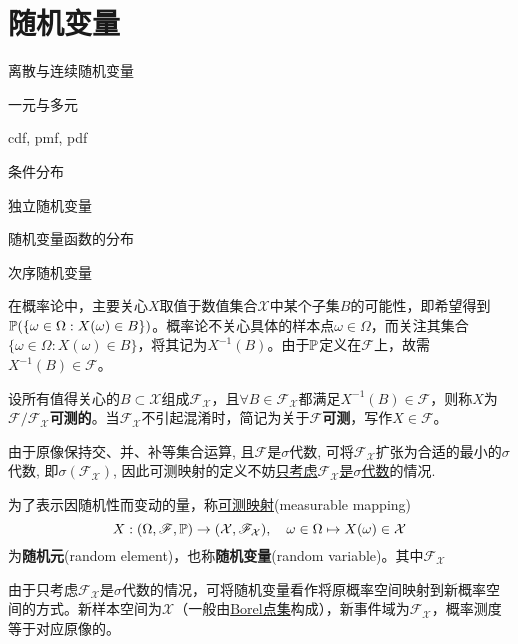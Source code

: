 \chapter{随机变量}

\begin{introduction}
    \item 离散与连续随机变量
    \item 一元与多元
    \item cdf, pmf, pdf
    \item 条件分布
    \item 独立随机变量
    \item 随机变量函数的分布
    \item 次序随机变量
\end{introduction}

在概率论中，主要关心$X$取值于数值集合$\mathcal{X}$中某个子集$B$的可能性，即希望得到$\P(\{\omega\in\Omega : X(\omega) \in B\})$。概率论不关心具体的样本点$\omega\in\Omega$，而关注其集合$\{\omega\in\Omega : X(\omega) \in B\}$，将其记为$X^{-1}(B)$。由于$\P$定义在$\mathscr{F}$上，故需$X^{-1}(B) \in \mathscr{F}$。

\begin{definition}[可测性]
    设所有值得关心的$B\subset \mathcal{X}$组成$\mathscr{F}_{\mathcal{X}}$，且$\forall B \in \mathscr{F}_{\mathcal{X}}$都满足$X^{-1}(B) \in \mathscr{F}$，则称$X$为$\mathscr{F}/\mathscr{F}_{\mathcal{X}}$\textbf{可测的}。当$\mathscr{F}_{\mathcal{X}}$不引起混淆时，简记为关于$\mathscr{F}$\textbf{可测}，写作$X \in \mathscr{F}$。
\end{definition}

由于原像保持交、并、补等集合运算, 且$\mathscr{F}$是$\sigma$代数, 可将$\mathscr{F}_{\mathcal{X}}$扩张为合适的最小的$\sigma$代数, 即$\sigma(\mathscr{F}_{\mathcal{X}})$, 因此可测映射的定义不妨\underline{只考虑$\mathscr{F}_{\mathcal{X}}$是$\sigma$代数}的情况.

\begin{definition}[随机变量]
    为了表示因随机性而变动的量，称\underline{可测映射}(measurable mapping)
    \[ X : (\Omega,\mathscr{F},\P) \to (\mathcal{X},\mathscr{F}_{\mathcal{X}}), \quad \omega\in\Omega \mapsto X(\omega)\in\mathcal{X} \]
    为\textbf{随机元}(random element)，也称\textbf{随机变量}(random variable)。其中$\mathscr{F}_{\mathcal{X}}$
\end{definition}

由于只考虑$\mathscr{F}_{\mathcal{X}}$是$\sigma$代数的情况，可将随机变量看作将原概率空间映射到新概率空间的方式。新样本空间为$\mathcal{X}$（一般由\underline{Borel点集}构成），新事件域为$\mathscr{F}_{\mathcal{X}}$，概率测度等于对应原像的。


